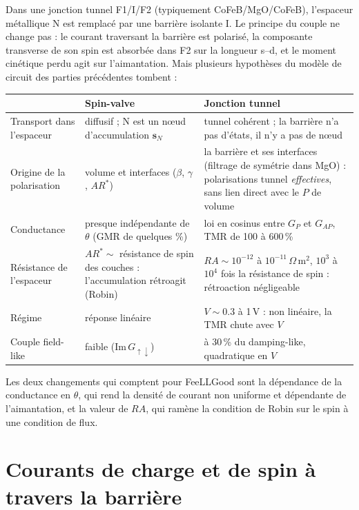 \documentclass[11pt,a4paper]{article}
\newcommand{\vs}{\bm{s}}
\begin{document}
Dans une jonction tunnel F1/I/F2 (typiquement CoFeB/MgO/CoFeB), l'espaceur
métallique N est remplacé par une barrière isolante I. Le principe du
couple ne change pas : le courant traversant la barrière est polarisé, la
composante transverse de son spin est absorbée dans F2 sur la longueur
s--d, et le moment cinétique perdu agit sur l'aimantation. Mais plusieurs
hypothèses du modèle de circuit des parties précédentes tombent :
\begin{center}
\renewcommand{\arraystretch}{1.25}
\begin{tabular}{>{\raggedright}p{3.4cm}>{\raggedright}p{5.0cm}>{\raggedright\arraybackslash}p{5.2cm}}
  \toprule
  & \textbf{Spin-valve} & \textbf{Jonction tunnel} \\
  \midrule
  Transport dans l'espaceur & diffusif ; N est un nœud d'accumulation
    $\vs_N$ & tunnel cohérent ; la barrière n'a pas d'états, il n'y a pas
    de nœud \\
  Origine de la polarisation & volume et interfaces ($\beta$, $\gamma$,
    $AR^*$) & la barrière et ses interfaces (filtrage de symétrie dans
    MgO) : polarisations tunnel \emph{effectives}, sans lien direct avec
    le $P$ de volume \\
  Conductance & presque indépendante de $\theta$ (GMR de quelques \%) &
    loi en cosinus entre $G_P$ et $G_{AP}$, TMR de 100 à 600\,\% \\
  Résistance de l'espaceur & $AR^*\sim$ résistance de spin des couches :
    l'accumulation rétroagit (Robin) & $RA\sim10^{-12}$ à
    $10^{-11}\,\Omega\,$m$^2$, $10^3$ à $10^4$ fois la résistance de
    spin : rétroaction négligeable \\
  Régime & réponse linéaire & $V\sim0.3$ à 1\,V : non linéaire, la TMR
    chute avec $V$ \\
  Couple field-like & faible ($\mathrm{Im}\,G_{\uparrow\downarrow}$) &
    10 à 30\,\% du damping-like, quadratique en $V$ \\
  \bottomrule
\end{tabular}
\end{center}
Les deux changements qui comptent pour FeeLLGood sont la dépendance de la
conductance en $\theta$, qui rend la densité de courant non uniforme et
dépendante de l'aimantation, et la valeur de $RA$, qui ramène la condition
de Robin sur le spin à une condition de flux.

\section{Courants de charge et de spin à travers la barrière}
\label{sec:tunnel-courants}
\end{document}
